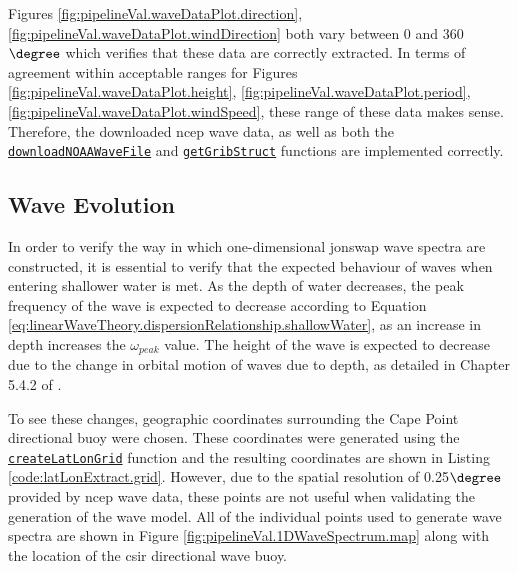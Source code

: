 Figures \ref{fig:pipelineVal.waveDataPlot.direction}, \ref{fig:pipelineVal.waveDataPlot.windDirection} both vary between 0 and 360$\degree$ which verifies that these data are correctly extracted. In terms of agreement within acceptable ranges for Figures \ref{fig:pipelineVal.waveDataPlot.height}, \ref{fig:pipelineVal.waveDataPlot.period}, \ref{fig:pipelineVal.waveDataPlot.windSpeed}, these range of these data makes sense. Therefore, the downloaded \acs{ncep} wave data, as well as both the \href{https://github.com/JNSRYA006/sar-parameter-extraction-pipeline/blob/main/functions/preprocess/get512Transects.m}{\lstinline{downloadNOAAWaveFile}} and \href{https://github.com/JNSRYA006/sar-parameter-extraction-pipeline/blob/main/functions/preprocess/get512Transects.m}{\lstinline{getGribStruct}} functions are implemented correctly.

\subsection{Wave Evolution} \label{subsec:pipelineVal.waveSpectra.waveEvolution}

In order to verify the way in which one-dimensional \acs{jonswap} wave spectra are constructed, it is essential to verify that the expected behaviour of waves when entering shallower water is met. As the depth of water decreases, the peak frequency of the wave is expected to decrease according to Equation \ref{eq:linearWaveTheory.dispersionRelationship.shallowWater}, as an increase in depth increases the $\omega_{peak}$ value. The height of the wave is expected to decrease due to the change in orbital motion of waves due to depth, as detailed in Chapter 5.4.2 of \cite{Holthuijsen2007}. 

To see these changes, geographic coordinates surrounding the Cape Point directional buoy were chosen. These coordinates were generated using the \href{https://github.com/JNSRYA006/sar-parameter-extraction-pipeline/blob/main/functions/waveSpectra/generateSingleJONSWAP.m}{\lstinline{createLatLonGrid}} function and the resulting coordinates are shown in Listing \ref{code:latLonExtract.grid}. However, due to the spatial resolution of 0.25$\degree$ provided by \acs{ncep} wave data, these points are not useful when validating the generation of the wave model. All of the individual points used to generate wave spectra are shown in Figure \ref{fig:pipelineVal.1DWaveSpectrum.map} along with the location of the \acs{csir} directional wave buoy. 

